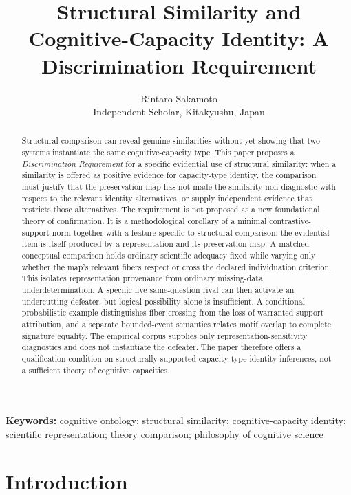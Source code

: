 \documentclass[11pt]{article}
\title{Structural Similarity and Cognitive-Capacity Identity: A Discrimination Requirement}
\author{Rintaro Sakamoto\\Independent Scholar, Kitakyushu, Japan}
\date{}
\begin{document}
\maketitle

\noindent\textbf{Keywords:} cognitive ontology; structural similarity; cognitive-capacity identity; scientific representation; theory comparison; philosophy of cognitive science


\begin{abstract}

Structural comparison can reveal genuine similarities without yet showing that two systems instantiate the same cognitive-capacity type. This paper proposes a \emph{Discrimination Requirement} for a specific evidential use of structural similarity: when a similarity is offered as positive evidence for capacity-type identity, the comparison must justify that the preservation map has not made the similarity non-diagnostic with respect to the relevant identity alternatives, or supply independent evidence that restricts those alternatives. The requirement is not proposed as a new foundational theory of confirmation. It is a methodological corollary of a minimal contrastive-support norm together with a feature specific to structural comparison: the evidential item is itself produced by a representation and its preservation map. A matched conceptual comparison holds ordinary scientific adequacy fixed while varying only whether the map's relevant fibers respect or cross the declared individuation criterion. This isolates representation provenance from ordinary missing-data underdetermination. A specific live same-question rival can then activate an undercutting defeater, but logical possibility alone is insufficient. A conditional probabilistic example distinguishes fiber crossing from the loss of warranted support attribution, and a separate bounded-event semantics relates motif overlap to complete signature equality. The empirical corpus supplies only representation-sensitivity diagnostics and does not instantiate the defeater. The paper therefore offers a qualification condition on structurally supported capacity-type identity inferences, not a sufficient theory of cognitive capacities.

\end{abstract}

\section{Introduction}
\end{document}
